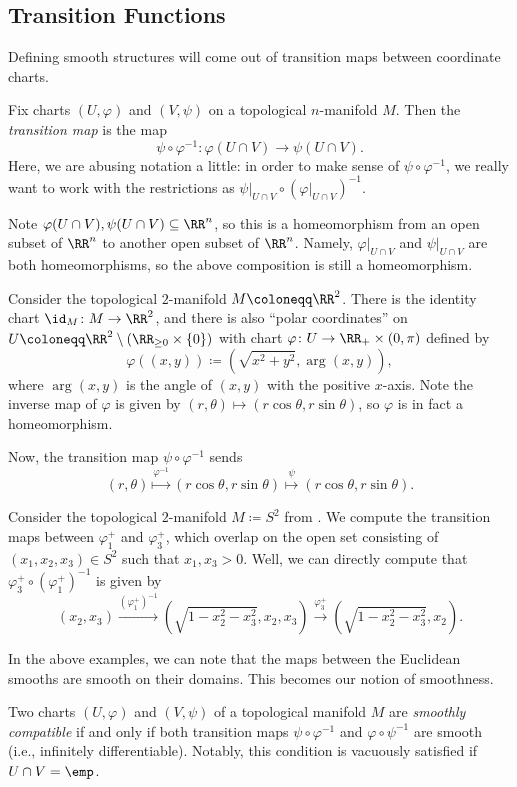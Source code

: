 \documentclass[../notes.tex]{subfiles}
\begin{document}
\subsection{Transition Functions}
Defining smooth structures will come out of transition maps between coordinate charts.
\begin{definition}
	Fix charts $(U,\varphi)$ and $(V,\psi)$ on a topological $n$-manifold $M$. Then the \textit{transition map} is the map
	\[\psi\circ\varphi^{-1}\colon\varphi(U\cap V)\to\psi(U\cap V).\]
	Here, we are abusing notation a little: in order to make sense of $\psi\circ\varphi^{-1}$, we really want to work with the restrictions as $\psi|_{U\cap V}\circ(\varphi|_{U\cap V})^{-1}$.
\end{definition}
\begin{remark}
	Note $\varphi(U\cap V),\psi(U\cap V)\subseteq\RR^n$, so this is a homeomorphism from an open subset of $\RR^n$ to another open subset of $\RR^n$. Namely, $\varphi|_{U\cap V}$ and $\psi|_{U\cap V}$ are both homeomorphisms, so the above composition is still a homeomorphism.
\end{remark}
\begin{example}
	Consider the topological $2$-manifold $M\coloneqq\RR^2$. There is the identity chart $\id_M\colon M\to\RR^2$, and there is also ``polar coordinates'' on $U\coloneqq\RR^2\setminus(\RR_{\ge0}\times\{0\})$ with chart $\varphi\colon U\to\RR_+\times(0,\pi)$ defined by
	\[\varphi((x,y))\coloneqq\left(\sqrt{x^2+y^2},\arg(x,y)\right),\]
	where $\arg(x,y)$ is the angle of $(x,y)$ with the positive $x$-axis. Note the inverse map of $\varphi$ is given by $(r,\theta)\mapsto(r\cos\theta,r\sin\theta)$, so $\varphi$ is in fact a homeomorphism.

	Now, the transition map $\psi\circ\varphi^{-1}$ sends
	\[(r,\theta)\stackrel{\varphi^{-1}}\mapsto(r\cos\theta,r\sin\theta)\stackrel\psi\mapsto(r\cos\theta,r\sin\theta).\]
\end{example}
\begin{example}
	Consider the topological $2$-manifold $M\coloneqq S^2$ from . We compute the transition maps between $\varphi_1^+$ and $\varphi_3^+$, which overlap on the open set consisting of $(x_1,x_2,x_3)\in S^2$ such that $x_1,x_3>0$. Well, we can directly compute that $\varphi_3^+\circ\left(\varphi_1^+\right)^{-1}$ is given by
	\[(x_2,x_3)\stackrel{(\varphi_1^+)^{-1}}\to\left(\sqrt{1-x_2^2-x_3^2},x_2,x_3\right)\stackrel{\varphi_3^+}\to\left(\sqrt{1-x_2^2-x_3^2},x_2\right).\]
\end{example}
In the above examples, we can note that the maps between the Euclidean smooths are smooth on their domains. This becomes our notion of smoothness.
\begin{definition}
	Two charts $(U,\varphi)$ and $(V,\psi)$ of a topological manifold $M$ are \textit{smoothly compatible} if and only if both transition maps $\psi\circ\varphi^{-1}$ and $\varphi\circ\psi^{-1}$ are smooth (i.e., infinitely differentiable). Notably, this condition is vacuously satisfied if $U\cap V=\emp$.
\end{definition}
\end{document}
